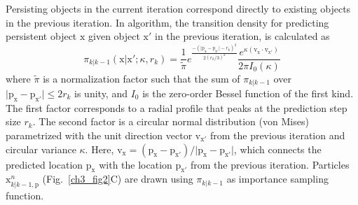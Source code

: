 Persisting objects in the current iteration correspond directly to existing objects in the previous iteration. In algorithm, the transition density for predicting persistent object $\mathrm{x}$ given object $\mathrm{x'}$ in the previous iteration, is calculated as
\begin{equation}
\label{eq:persist-prediction}
\pi_{k|k-1}(\mathrm{x}|\mathrm{x'}; \kappa, r_k) = \frac{1}{\tilde{\pi}} e^{\frac{-(\vert \mathrm{p}_{\mathrm{x}} - \mathrm{p}_{\mathrm{x'}}  \vert - r_k)^2  }{2 (r_k/3)^2}} \frac{e^{\kappa (\mathrm{v}_{\mathrm{x}} \cdot \mathrm{v}_{\mathrm{x'}})}}{2 \pi I_0(\kappa)}
\end{equation}
where $\tilde{\pi}$ is a normalization factor such that the sum of $\pi_{k|k-1}$ over $\vert \mathrm{p}_{\mathrm{x}} - \mathrm{p}_{\mathrm{x'}} \vert \leq 2r_k$ is unity, and $I_0$ is the zero-order Bessel function of the first kind. The first factor corresponds to a radial profile that peaks at the prediction step size $r_k$. The second factor is a circular normal distribution (von Mises) parametrized with the unit direction vector $\mathrm{v}_{\mathrm{x'}}$ from the previous iteration and circular variance $\kappa$. Here, $\mathrm{v}_{\mathrm{x}} = (\mathrm{p}_{\mathrm{x}} - \mathrm{p}_{\mathrm{x'}})/\vert \mathrm{p}_{\mathrm{x}} - \mathrm{p}_{\mathrm{x'}} \vert$, which connects the predicted location $\mathrm{p}_{\mathrm{x}}$ with the location $\mathrm{p}_{\mathrm{x'}}$ from the previous iteration. Particles $\mathrm{x}_{k|k-1,\mathrm{p}}^{n}$ (Fig.~\ref{ch3_fig2}C) are drawn using $\pi_{k|k-1}$ as importance sampling function.

